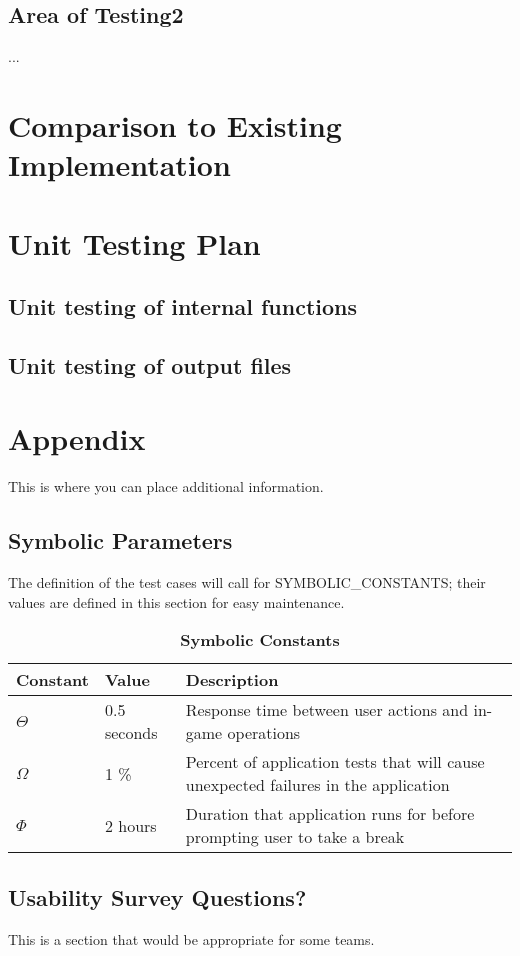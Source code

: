 \documentclass[12pt, titlepage]{article}
\begin{document}
\subsection{Area of Testing2}

...

	
\section{Comparison to Existing Implementation}	
				
\section{Unit Testing Plan}
		
\subsection{Unit testing of internal functions}
		
\subsection{Unit testing of output files}		

%

%

\newpage

\section{Appendix}

This is where you can place additional information.

\subsection{Symbolic Parameters}

The definition of the test cases will call for SYMBOLIC\_CONSTANTS; their values are defined in this section for easy maintenance.

\begin{table}[H]
\caption{\bf Symbolic Constants} \label{tab:constants}
\begin{tabularx}{\textwidth}{p{3cm}p{2cm}X}
\toprule {\bf Constant} & {\bf Value} & {\bf Description}\\
\midrule
$\Theta$ & 0.5 seconds & Response time between user actions and in-game operations\\
$\Omega$ & 1 \% & Percent of application tests that will cause unexpected failures in the application\\
$\Phi$ & 2 hours & Duration that application runs for before prompting user to take a break\\
\bottomrule
\end{tabularx}
\end{table}

\subsection{Usability Survey Questions?}

This is a section that would be appropriate for some teams.
\end{document}
